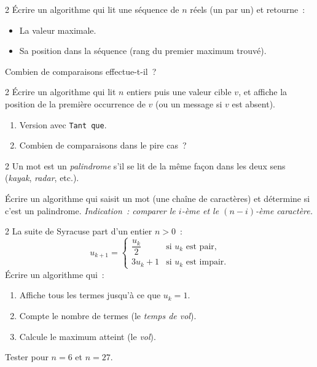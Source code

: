 \begin{exo}{2}
\'Ecrire un algorithme qui lit une s\'equence de $n$ r\'eels (un par un)
et retourne~:
\begin{itemize}
  \item La valeur maximale.
  \item Sa position dans la s\'equence (rang du premier maximum trouv\'e).
\end{itemize}
Combien de comparaisons effectue-t-il~?
\end{exo}

\begin{exo}{2}
\'Ecrire un algorithme qui lit $n$ entiers puis une valeur cible $v$,
et affiche la position de la premi\`ere occurrence de $v$
(ou un message si $v$ est absent).
\begin{enumerate}
  \item Version avec \texttt{Tant que}.
  \item Combien de comparaisons dans le pire cas~?
\end{enumerate}
\end{exo}

\begin{exo}{2}
Un mot est un \emph{palindrome} s'il se lit de la m\^eme fa\c con dans
les deux sens (\og \textit{kayak}\fg, \og \textit{radar}\fg, etc.).

\'Ecrire un algorithme qui saisit un mot (une cha\^ine de caract\`eres)
et d\'etermine si c'est un palindrome.
\emph{Indication~: comparer le $i$-\`eme et le $(n-i)$-\`eme caract\`ere.}
\end{exo}

\begin{exo}{2}
La suite de Syracuse part d'un entier $n > 0$~:
\[ u_{k+1} = \begin{cases} \dfrac{u_k}{2} & \text{si } u_k \text{ est pair,} \\
3u_k + 1 & \text{si } u_k \text{ est impair.}\end{cases} \]
\'Ecrire un algorithme qui~:
\begin{enumerate}
  \item Affiche tous les termes jusqu'\`a ce que $u_k = 1$.
  \item Compte le nombre de termes (le \emph{temps de vol}).
  \item Calcule le maximum atteint (le \emph{vol}).
\end{enumerate}
Tester pour $n = 6$ et $n = 27$.
\end{exo}


